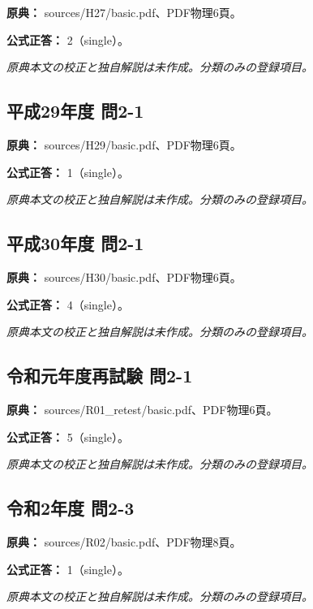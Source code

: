 \noindent\textbf{原典：} sources/H27/basic.pdf、PDF物理6頁。

\textbf{公式正答：} 2（single）。

\par\textit{原典本文の校正と独自解説は未作成。分類のみの登録項目。}

\subsection{平成29年度 問2-1}
\label{q:h29-reg-basic-2-1}

\noindent\textbf{原典：} sources/H29/basic.pdf、PDF物理6頁。

\textbf{公式正答：} 1（single）。

\par\textit{原典本文の校正と独自解説は未作成。分類のみの登録項目。}

\subsection{平成30年度 問2-1}
\label{q:h30-reg-basic-2-1}

\noindent\textbf{原典：} sources/H30/basic.pdf、PDF物理6頁。

\textbf{公式正答：} 4（single）。

\par\textit{原典本文の校正と独自解説は未作成。分類のみの登録項目。}

\subsection{令和元年度再試験 問2-1}
\label{q:r01-ret-basic-2-1}

\noindent\textbf{原典：} sources/R01\_retest/basic.pdf、PDF物理6頁。

\textbf{公式正答：} 5（single）。

\par\textit{原典本文の校正と独自解説は未作成。分類のみの登録項目。}

\subsection{令和2年度 問2-3}
\label{q:r02-reg-basic-2-3}

\noindent\textbf{原典：} sources/R02/basic.pdf、PDF物理8頁。

\textbf{公式正答：} 1（single）。

\par\textit{原典本文の校正と独自解説は未作成。分類のみの登録項目。}

